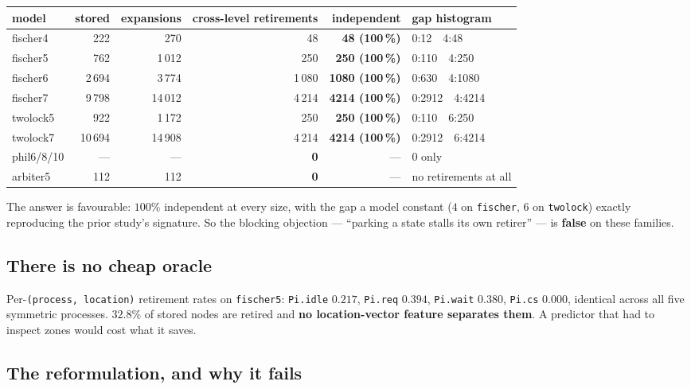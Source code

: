 \begin{center}\small
\begin{tabular}{lrrrrl}
\toprule
model & stored & expansions & cross-level retirements & \textbf{independent} & gap histogram \\
\midrule
fischer4 & 222    & 270    & 48    & \textbf{48 (100\,\%)}   & 0:12\ \ 4:48 \\
fischer5 & 762    & 1\,012 & 250   & \textbf{250 (100\,\%)}  & 0:110\ \ 4:250 \\
fischer6 & 2\,694 & 3\,774 & 1\,080& \textbf{1080 (100\,\%)} & 0:630\ \ 4:1080 \\
fischer7 & 9\,798 & 14\,012& 4\,214& \textbf{4214 (100\,\%)} & 0:2912\ \ 4:4214 \\
twolock5 & 922    & 1\,172 & 250   & \textbf{250 (100\,\%)}  & 0:110\ \ 6:250 \\
twolock7 & 10\,694& 14\,908& 4\,214& \textbf{4214 (100\,\%)} & 0:2912\ \ 6:4214 \\
phil6/8/10 & --- & --- & \textbf{0} & --- & 0 only \\
arbiter5 & 112 & 112 & \textbf{0} & --- & no retirements at all \\
\bottomrule
\end{tabular}
\end{center}
\measured{}

The answer is favourable: $100\%$ independent at every size, with the gap a model constant ($4$ on
\texttt{fischer}, $6$ on \texttt{twolock}) exactly reproducing the prior study's signature. So the
blocking objection --- ``parking a state stalls its own retirer'' --- is \textbf{false} on these
families.

\subsection{There is no cheap oracle}

Per-\texttt{(process, location)} retirement rates on \texttt{fischer5}: \texttt{Pi.idle} $0.217$,
\texttt{Pi.req} $0.394$, \texttt{Pi.wait} $0.380$, \texttt{Pi.cs} $0.000$, identical across all five
symmetric processes. $32.8\%$ of stored nodes are retired and \textbf{no location-vector feature
separates them}. \measured{} A predictor that had to inspect zones would cost what it saves.

\subsection{The reformulation, and why it fails}

